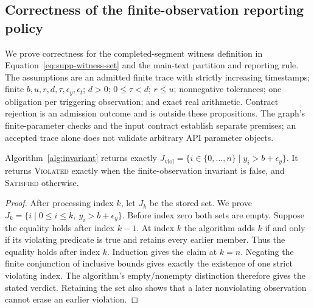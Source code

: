 \subsection{Correctness of the finite-observation reporting policy}
\label{sec:finite-policy-proof}

We prove correctness for the completed-segment witness definition in Equation~\eqref{eq:supp-witness-set} and the main-text partition and reporting rule. The assumptions are an admitted finite trace with strictly increasing timestamps; finite $b,u,r,d,\tau,\epsilon_y,\epsilon_t$; $d>0$; $0\leq\tau<d$; $r\leq u$; nonnegative tolerances; one obligation per triggering observation; and exact real arithmetic. Contract rejection is an admission outcome and is outside these propositions. The graph's finite-parameter checks and the input contract establish separate premises; an accepted trace alone does not validate arbitrary API parameter objects.

\begin{proposition}
\label{prop:invariant-complete}
Algorithm~\ref{alg:invariant} returns exactly
$J_{\mathrm{viol}}=\{i\in\{0,\ldots,n\}\mid y_i>b+\epsilon_y\}$.
It returns \textnormal{\textsc{Violated}} exactly when the finite-observation invariant is false, and \textnormal{\textsc{Satisfied}} otherwise.
\end{proposition}
\begin{proof}
After processing index $k$, let $J_k$ be the stored set. We prove
$J_k=\{i\mid 0\leq i\leq k,\ y_i>b+\epsilon_y\}$.
Before index zero both sets are empty. Suppose the equality holds after index $k-1$. At index $k$ the algorithm adds $k$ if and only if its violating predicate is true and retains every earlier member. Thus the equality holds after index $k$. Induction gives the claim at $k=n$. Negating the finite conjunction of inclusive bounds gives exactly the existence of one strict violating index. The algorithm's empty/nonempty distinction therefore gives the stated verdict. Retaining the set also shows that a later nonviolating observation cannot erase an earlier violation.
\end{proof}

